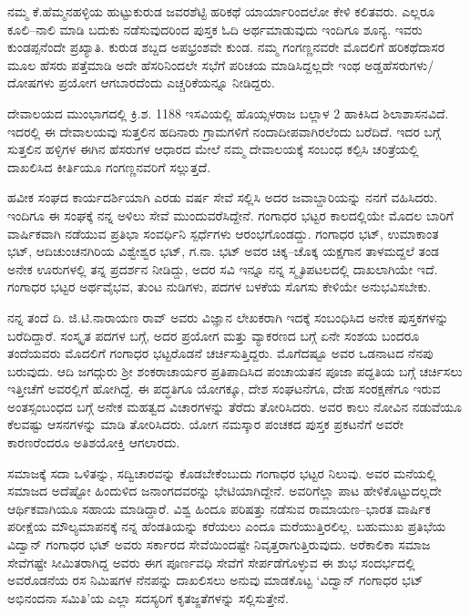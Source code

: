 ನಮ್ಮ ಕೆ.ಹೆಮ್ಮನಹಳ್ಳಿಯ ಹುಟ್ಟುಕುರುಡ ಜವರಶೆಟ್ಟಿ ಹರಿಕಥೆ ಯಾರ್ಯಾರಿಂದಲೋ ಕೇಳಿ ಕಲಿತವರು. ಎಲ್ಲರೂ ಕೂಲಿ–ನಾಲಿ ಮಾಡಿ ಬದುಕು ನಡೆಸುವುದರಿಂದ ಪುಸ್ತಕ ಓದಿ ಅರ್ಥಮಾಡುವುದು ಇಂದಿಗೂ ಶೂನ್ಯ. ಇವರು ಕುಂಡಪ್ಪನೆಂದೇ ಪ್ರಖ್ಯಾತಿ. ಕುರುಡ ಶಬ್ದದ ಅಪಭ್ರಂಶವೇ ಕುಂಡ. ನಮ್ಮ ಗಂಗಣ್ಣನವರೇ ಮೊದಲಿಗೆ ಹರಿಕಥೆದಾಸರ ಮೂಲ ಹೆಸರು ಪತ್ತೆಮಾಡಿ ಅದೇ ಹೆಸರಿನಿಂದಲೇ ಸಭೆಗೆ ಪರಿಚಯ ಮಾಡಿಸಿದ್ದಲ್ಲದೇ ಇಂಥ ಅಡ್ಡಹೆಸರುಗಳು/ದೋಷಗಳು ಪ್ರಯೋಗ ಆಗಬಾರದೆಂದು ಎಚ್ಚರಿಕೆಯನ್ನೂ ನೀಡಿದ್ದರು.

ದೇವಾಲಯದ ಮುಂಭಾಗದಲ್ಲಿ ಕ್ರಿ.ಶ. 1188 ಇಸವಿಯಲ್ಲಿ ಹೊಯ್ಸಳರಾಜ ಬಲ್ಲಾಳ 2 ಹಾಕಿಸಿದ ಶಿಲಾಶಾಸನವಿದೆ. ಇದರಲ್ಲಿ ಈ ದೇವಾಲಯವು ಸುತ್ತಲಿನ ಹದಿನಾರು ಗ್ರಾಮಗಳಿಗೆ ನಂದಾದೀಪವಾಗಿರಲೆಂದು ಬರೆದಿದೆ. ಇದರ ಬಗ್ಗೆ ಸುತ್ತಲಿನ ಹಳ್ಳಿಗಳ ಈಗಿನ ಹೆಸರುಗಳ ಆಧಾರದ ಮೇಲೆ ನಮ್ಮ ದೇವಾಲಯಕ್ಕೆ ಸಂಬಂಧ ಕಲ್ಪಿಸಿ ಚರಿತ್ರೆಯಲ್ಲಿ ದಾಖಲಿಸಿದ ಕೀರ್ತಿಯೂ ಗಂಗಣ್ಣನವರಿಗೆ ಸಲ್ಲುತ್ತದೆ.

ಹವೀಕ ಸಂಘದ ಕಾರ್ಯದರ್ಶಿಯಾಗಿ ಎರಡು ವರ್ಷ ಸೇವೆ ಸಲ್ಲಿಸಿ ಅದರ ಜವಾಬ್ದಾರಿಯನ್ನು ನನಗೆ ವಹಿಸಿದರು. ಇಂದಿಗೂ ಈ ಸಂಘಕ್ಕೆ ನನ್ನ ಅಳಿಲು ಸೇವೆ ಮುಂದುವರೆಸಿದ್ದೇನೆ. ಗಂಗಾಧರ ಭಟ್ಟರ ಕಾಲದಲ್ಲಿಯೇ ಮೊದಲ ಬಾರಿಗೆ ವಾರ್ಷಿಕವಾಗಿ ನಡೆಯುವ ಪ್ರತಿಭಾ ಸಂವರ್ಧಿನಿ ಸ್ಪರ್ಧೆಗಳು ಆರಂಭಗೊಂಡದ್ದು. ಗಂಗಾಧರ ಭಟ್, ಉಮಾಕಾಂತ ಭಟ್, ಆದಿಚುಂಚನಗಿರಿಯ ವಿಶ್ವೇಶ್ವರ ಭಟ್, ಗ.ನಾ. ಭಟ್ ಅವರ ಚಿಕ್ಕ–ಚೊಕ್ಕ ಯಕ್ಷಗಾನ ತಾಳಮದ್ದಲೆ ತಂಡ ಅನೇಕ ಊರುಗಳಲ್ಲಿ ತನ್ನ ಪ್ರದರ್ಶನ ನೀಡಿದ್ದು, ಅದರ ಸವಿ ಇನ್ನೂ ನನ್ನ ಸ್ಮೃತಿಪಟಲದಲ್ಲಿ ದಾಖಲಾಗಿಯೇ ಇದೆ. ಗಂಗಾಧರ ಭಟ್ಟರ ಅರ್ಥವೈಭವ, ತುಂಟ ನುಡಿಗಳು, ಪದಗಳ ಬಳಕೆಯ ಸೊಗಸು ಕೇಳಿಯೇ ಅನುಭವಿಸಬೇಕು.

ನನ್ನ ತಂದೆ ದಿ. ಜಿ.ಟಿ.ನಾರಾಯಣ ರಾವ್ ಅವರು ವಿಜ್ಞಾನ ಲೇಖಕರಾಗಿ ಇದಕ್ಕೆ ಸಂಬಂಧಿಸಿದ ಅನೇಕ ಪುಸ್ತಕಗಳನ್ನು ಬರೆದಿದ್ದಾರೆ. ಸಂಸ್ಕೃತ ಪದಗಳ ಬಗ್ಗೆ, ಅದರ ಪ್ರಯೋಗ ಮತ್ತು ವ್ಯಾಕರಣದ ಬಗ್ಗೆ ಏನೇ ಸಂಶಯ ಬಂದರೂ ತಂದೆಯವರು ಮೊದಲಿಗೆ ಗಂಗಾಧರ ಭಟ್ಟರೊಡನೆ ಚರ್ಚಿಸುತ್ತಿದ್ದರು. ಮೊಗೆದಷ್ಟೂ ಅವರ ಒಡನಾಟದ ನೆನಪು ಬರುವುದು. ಆದಿ ಜಗದ್ಗುರು ಶ್ರೀ ಶಂಕರಾಚಾರ್ಯರ ಪ್ರತಿಪಾದಿಸಿದ ಪಂಚಾಯತನ ಪೂಜಾ ಪದ್ದತಿಯ ಬಗ್ಗೆ ಚರ್ಚಿಸಲು ಇತ್ತೀಚೆಗೆ ಅವರಲ್ಲಿಗೆ ಹೋಗಿದ್ದೆ. ಈ ಪದ್ಧತಿಗೂ ಯೋಗಕ್ಕೂ, ದೇಶ ಸಂಘಟನೆಗೂ, ದೇಹ ಸಂರಕ್ಷಣೆಗೂ ಇರುವ ಅಂತಸ್ಸಂಬಂಧದ ಬಗ್ಗೆ ಅನೇಕ ಮಹತ್ವದ ವಿಚಾರಗಳನ್ನು ತೆರೆದು ತೋರಿಸಿದರು. ಅವರ ಕಾಲು ನೋವಿನ ನಡುವೆಯೂ ಕೆಲವಷ್ಟು ಆಸನಗಳನ್ನು ಮಾಡಿ ತೋರಿಸಿದರು. ಯೋಗ ನಮಸ್ಕಾರ ಪಂಚಕದ ಪುಸ್ತಕ ಪ್ರಕಟನೆಗೆ ಅವರೇ ಕಾರಣರೆಂದರೂ ಅತಿಶಯೋಕ್ತಿ ಆಗಲಾರದು. 

ಸಮಾಜಕ್ಕೆ ಸದಾ ಒಳಿತನ್ನು, ಸದ್ವಿಚಾರವನ್ನು ಕೊಡಬೇಕೆಂಬುದು ಗಂಗಾಧರ ಭಟ್ಟರ ನಿಲುವು. ಅವರ ಮನೆಯಲ್ಲಿ ಸಮಾಜದ ಅದೆಷ್ಟೋ ಹಿಂದುಳಿದ ಜನಾಂಗದವರನ್ನು ಭೇಟಿಯಾಗಿದ್ದೇನೆ. ಅವರಿಗೆಲ್ಲಾ ಪಾಟ ಹೇಳಿಕೊಟ್ಟುದಲ್ಲದೇ  ಆರ್ಥಿಕವಾಗಿಯೂ ಸಹಾಯ ಮಾಡಿದ್ದಾರೆ. ವಿಶ್ವ ಹಿಂದೂ ಪರಿಷತ್ತು ನಡೆಸುವ ರಾಮಾಯಣ–ಭಾರತ ವಾರ್ಷಿಕ ಪರೀಕ್ಷೆಯ ಮೌಲ್ಯಮಾಪನಕ್ಕೆ ನನ್ನ ಹೆಂಡತಿಯನ್ನು ಕರೆಯಲು ಎಂದೂ ಮರೆಯುತ್ತಿರಲಿಲ್ಲ.   ಬಹುಮುಖ ಪ್ರತಿಭೆಯ ವಿದ್ವಾನ್ ಗಂಗಾಧರ ಭಟ್ ಅವರು ಸರ್ಕಾರದ ಸೇವೆಯಿಂದಷ್ಟೇ ನಿವೃತ್ತರಾಗುತ್ತಿರುವುದು. ಅರೆಕಾಲಿಕಾ ಸಮಾಜ ಸೇವೆಗಷ್ಟೇ ಸೀಮಿತರಾಗಿದ್ದ ಅವರು ಈಗ ಪೂರ್ಣವಧಿ ಸೇವೆಗೆ ಸೇರ್ಪಡೆಗೊಳ್ಳುವ ಈ ಶುಭ ಸಂದರ್ಭದಲ್ಲಿ ಅವರೊಡನೆಯ ರಸ ನಿಮಿಷಗಳ ನೆನಪನ್ನು ದಾಖಲಿಸಲು ಅನುವು ಮಾಡಕೊಟ್ಟ ‘ವಿದ್ವಾನ್ ಗಂಗಾಧರ ಭಟ್ ಅಭಿನಂದನಾ ಸಮಿತಿ’ಯ ಎಲ್ಲಾ ಸದಸ್ಯರಿಗೆ ಕೃತಜ್ಙತೆಗಳನ್ನು ಸಲ್ಲಿಸುತ್ತೇನೆ.                 

\articleend
